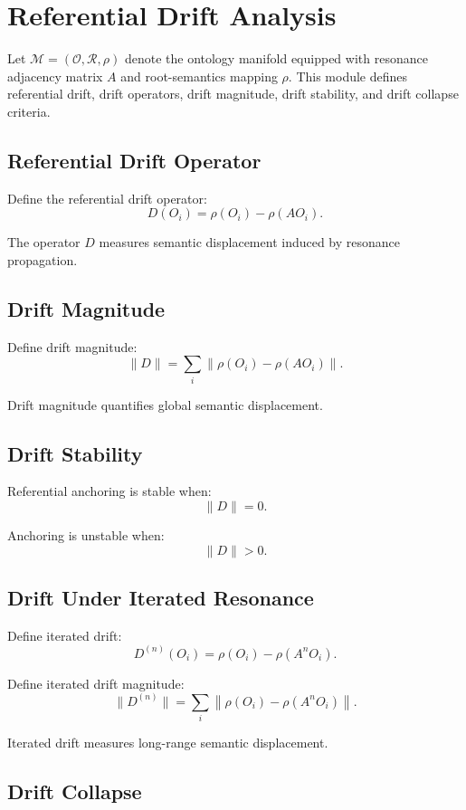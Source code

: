 \section{Referential Drift Analysis}

Let $\mathcal{M} = (\mathcal{O}, \mathcal{R}, \rho)$ denote the ontology
manifold equipped with resonance adjacency matrix $A$ and root-semantics
mapping $\rho$. This module defines referential drift, drift operators,
drift magnitude, drift stability, and drift collapse criteria.

\subsection{Referential Drift Operator}

Define the referential drift operator:
\[
D(O_i) = \rho(O_i) - \rho(A O_i).
\]

The operator $D$ measures semantic displacement induced by resonance
propagation.

\subsection{Drift Magnitude}

Define drift magnitude:
\[
\|D\| = \sum_i \left\| \rho(O_i) - \rho(A O_i) \right\|.
\]

Drift magnitude quantifies global semantic displacement.

\subsection{Drift Stability}

Referential anchoring is stable when:
\[
\|D\| = 0.
\]

Anchoring is unstable when:
\[
\|D\| > 0.
\]

\subsection{Drift Under Iterated Resonance}

Define iterated drift:
\[
D^{(n)}(O_i) = \rho(O_i) - \rho(A^n O_i).
\]

Define iterated drift magnitude:
\[
\|D^{(n)}\| = \sum_i \left\| \rho(O_i) - \rho(A^n O_i) \right\|.
\]

Iterated drift measures long-range semantic displacement.

\subsection{Drift Collapse}

